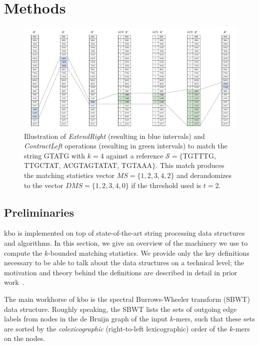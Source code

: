 \documentclass[unnumsec,webpdf,contemporary,large]{oup-authoring-template}%
\theoremstyle{thmstyleone}%
\theoremstyle{thmstyletwo}%
\theoremstyle{thmstylethree}%
\begin{document}
\section{Methods}\label{methods}

\begin{figure}[b]
    \centering
    \includegraphics[scale=0.6]{fig/SBWT_search_LCS.drawio.pdf}
    \caption{Illustration of {\em ExtendRight} (resulting in blue intervals) and {\em ContractLeft} operations (resulting in green intervals) to match the string {\sf GTATG} with $k=4$ against a reference $\mathcal{S}= \{${\sf TGTTTG}, {\sf TTGCTAT}, {\sf ACGTAGTATAT}, {\sf TGTAAA}$\}$. This match produces the matching statistics vector $MS=\{ 1, 2, 3, 4, 2 \}$ and derandomizes to the vector $DMS=\{ 1, 2, 3, 4, 0 \}$ if the threshold used is $t = 2$. }
    \label{fig:sbwt-search}
\end{figure}

\subsection{Preliminaries}\label{preliminaries}

{\sf kbo} is implemented on top of state-of-the-art string processing data structures and algorithms. In this section, we give an overview of the machinery we use to compute the $k$-bounded matching statistics. We provide only the key definitions necessary to be able to talk about the data structures on a technical level; the motivation and theory behind the definitions are described in detail in prior work~\cite{alanko2023longest, alanko2024finimizers, alanko2023small}.




The main workhorse of {\sf kbo} is the spectral Burrows-Wheeler transform (SBWT) data structure. Roughly speaking, the SBWT lists the sets of outgoing edge labels from nodes in the de Bruijn graph of the input $k$-mers, such that these sets are sorted by the \emph{colexicographic} (right-to-left lexicographic) order of the $k$-mers on the nodes.
\end{document}
